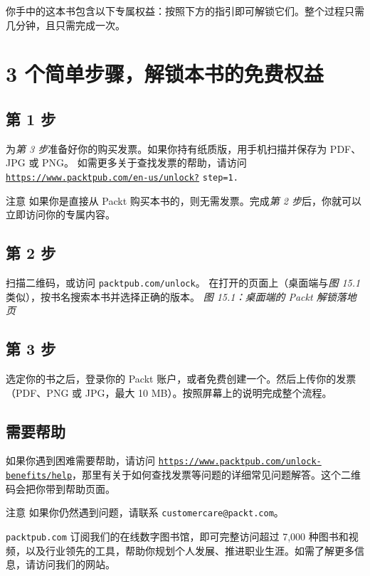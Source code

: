 你手中的这本书包含以下专属权益：按照下方的指引即可解锁它们。整个过程只需几分钟，且只需完成一次。
\section{3 个简单步骤，解锁本书的免费权益}
\subsection{第 1 步}
为\emph{第 3 步}准备好你的购买发票。如果你持有纸质版，用手机扫描并保存为 PDF、JPG 或 PNG。
如需更多关于查找发票的帮助，请访问 \href{https://www.packtpub.com/en-us/unlock?}{\texttt{https:/\allowbreak{}/\allowbreak{}www.\allowbreak{}packtpub.\allowbreak{}com/\allowbreak{}en-\allowbreak{}us/\allowbreak{}unlock?\allowbreak{}}}
\texttt{step=1.}
\begin{myNotic}{注意}
如果你是直接从 Packt 购买本书的，则无需发票。完成\emph{第 2 步}后，你就可以立即访问你的专属内容。
\end{myNotic}
\subsection{第 2 步}
扫描二维码，或访问 \texttt{packtpub.\allowbreak{}com/\allowbreak{}unlock}。
在打开的页面上（桌面端与\emph{图 15.1}类似），按书名搜索本书并选择正确的版本。
\emph{图 15.\allowbreak{}1：桌面端的 Packt 解锁落地页}
\subsection{第 3 步}
选定你的书之后，登录你的 Packt 账户，或者免费创建一个。然后上传你的发票（PDF、PNG 或 JPG，最大 10 MB）。按照屏幕上的说明完成整个流程。
\subsection{需要帮助}
如果你遇到困难需要帮助，请访问 \href{https://www.packtpub.com/unlock-benefits/help}{\texttt{https:/\allowbreak{}/\allowbreak{}www.\allowbreak{}packtpub.\allowbreak{}com/\allowbreak{}unlock-\allowbreak{}benefits/\allowbreak{}help}}，那里有关于如何查找发票等问题的详细常见问题解答。这个二维码会把你带到帮助页面。
\begin{myNotic}{注意}
如果你仍然遇到问题，请联系 \texttt{customercare@packt.\allowbreak{}com}。
\end{myNotic}
\texttt{packtpub.\allowbreak{}com}
订阅我们的在线数字图书馆，即可完整访问超过 7,\allowbreak{}000 种图书和视频，以及行业领先的工具，帮助你规划个人发展、推进职业生涯。如需了解更多信息，请访问我们的网站。
